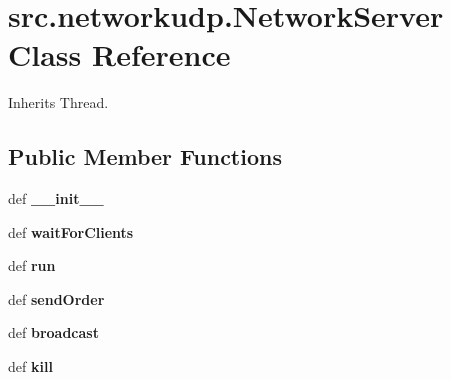 \hypertarget{classsrc_1_1networkudp_1_1_network_server}{\section{src.\-networkudp.\-Network\-Server \-Class \-Reference}
\label{classsrc_1_1networkudp_1_1_network_server}
}


\-Inherits \-Thread.

\subsection*{\-Public \-Member \-Functions}
\begin{DoxyCompactItemize}
\item 
\hypertarget{classsrc_1_1networkudp_1_1_network_server_a0f2e7b248ad9f5bae9ebe4274291e703}{def {\bfseries \-\_\-\-\_\-init\-\_\-\-\_\-}}\label{classsrc_1_1networkudp_1_1_network_server_a0f2e7b248ad9f5bae9ebe4274291e703}

\item 
\hypertarget{classsrc_1_1networkudp_1_1_network_server_aef027ba8a2e09b28ba6cde2110a914df}{def {\bfseries wait\-For\-Clients}}\label{classsrc_1_1networkudp_1_1_network_server_aef027ba8a2e09b28ba6cde2110a914df}

\item 
\hypertarget{classsrc_1_1networkudp_1_1_network_server_a535af8cc05c677b0d17cd6151b3b92e3}{def {\bfseries run}}\label{classsrc_1_1networkudp_1_1_network_server_a535af8cc05c677b0d17cd6151b3b92e3}

\item 
\hypertarget{classsrc_1_1networkudp_1_1_network_server_aa94aa32c52003e6e4f00d8e6137ad72c}{def {\bfseries send\-Order}}\label{classsrc_1_1networkudp_1_1_network_server_aa94aa32c52003e6e4f00d8e6137ad72c}

\item 
\hypertarget{classsrc_1_1networkudp_1_1_network_server_a5574b9156e04bec0d1d5eec428f4bc61}{def {\bfseries broadcast}}\label{classsrc_1_1networkudp_1_1_network_server_a5574b9156e04bec0d1d5eec428f4bc61}

\item 
\hypertarget{classsrc_1_1networkudp_1_1_network_server_ae48e706f92a60de9cef98bd281552f85}{def {\bfseries kill}}\label{classsrc_1_1networkudp_1_1_network_server_ae48e706f92a60de9cef98bd281552f85}

\end{DoxyCompactItemize}

